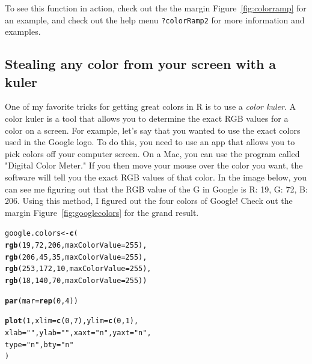 \documentclass{tufte-book}\usepackage[]{graphicx}\usepackage[]{color}
\makeatletter
\newcommand{\hlnum}[1]{\textcolor[rgb]{0.686,0.059,0.569}{#1}}%
\newcommand{\hlstr}[1]{\textcolor[rgb]{0.192,0.494,0.8}{#1}}%
\newcommand{\hlstd}[1]{\textcolor[rgb]{0.345,0.345,0.345}{#1}}%
\newcommand{\hlkwb}[1]{\textcolor[rgb]{0.69,0.353,0.396}{#1}}%
\newcommand{\hlkwc}[1]{\textcolor[rgb]{0.333,0.667,0.333}{#1}}%
\newcommand{\hlkwd}[1]{\textcolor[rgb]{0.737,0.353,0.396}{\textbf{#1}}}%
\newenvironment{kframe}{%
 \def\at@end@of@kframe{}%
 \ifinner\ifhmode%
  \def\at@end@of@kframe{\end{minipage}}%
  \begin{minipage}{\columnwidth}%
 \fi\fi%
 \def\FrameCommand##1{\hskip\@totalleftmargin \hskip-\fboxsep
 \colorbox{shadecolor}{##1}\hskip-\fboxsep
     \hskip-\linewidth \hskip-\@totalleftmargin \hskip\columnwidth}%
 \MakeFramed {\advance\hsize-\width
   \@totalleftmargin\z@ \linewidth\hsize
   \@setminipage}}%
 {\par\unskip\endMakeFramed%
 \at@end@of@kframe}
\newenvironment{knitrout}{}{} %
\makeatother
\begin{document}
\begin{footnotesize}
To see this function in action, check out the the margin Figure~\ref{fig:colorramp} for an example, and check out the help menu \texttt{?colorRamp2} for more information and examples.

\subsection{Stealing any color from your screen with a kuler}

One of my favorite tricks for getting great colors in R is to use a \textit{color kuler}. A color kuler is a tool that allows you to determine the exact RGB values for a color on a screen. For example, let's say that you wanted to use the exact colors used in the Google logo. To do this, you need to use an app that allows you to pick colors off your computer screen. On a Mac, you can use the program called "Digital Color Meter." If you then move your mouse over the color you want, the software will tell you the exact RGB values of that color. In the image below, you can see me figuring out that the RGB value of the G in Google is R: 19, G: 72, B: 206. Using this method, I figured out the four colors of Google! Check out the margin Figure~\ref{fig:googlecolors} for the grand result.

\begin{marginfigure}
\begin{tiny}
\begin{knitrout}
\color{fgcolor}\begin{kframe}
\begin{alltt}
\hlstd{google.colors} \hlkwb{<-} \hlkwd{c}\hlstd{(}
  \hlkwd{rgb}\hlstd{(}\hlnum{19}\hlstd{,} \hlnum{72}\hlstd{,} \hlnum{206}\hlstd{,} \hlkwc{maxColorValue} \hlstd{=} \hlnum{255}\hlstd{),}
  \hlkwd{rgb}\hlstd{(}\hlnum{206}\hlstd{,} \hlnum{45}\hlstd{,} \hlnum{35}\hlstd{,} \hlkwc{maxColorValue} \hlstd{=} \hlnum{255}\hlstd{),}
  \hlkwd{rgb}\hlstd{(}\hlnum{253}\hlstd{,} \hlnum{172}\hlstd{,} \hlnum{10}\hlstd{,} \hlkwc{maxColorValue} \hlstd{=} \hlnum{255}\hlstd{),}
  \hlkwd{rgb}\hlstd{(}\hlnum{18}\hlstd{,} \hlnum{140}\hlstd{,} \hlnum{70}\hlstd{,} \hlkwc{maxColorValue} \hlstd{=} \hlnum{255}\hlstd{))}

\hlkwd{par}\hlstd{(}\hlkwc{mar} \hlstd{=} \hlkwd{rep}\hlstd{(}\hlnum{0}\hlstd{,} \hlnum{4}\hlstd{))}

\hlkwd{plot}\hlstd{(}\hlnum{1}\hlstd{,} \hlkwc{xlim} \hlstd{=} \hlkwd{c}\hlstd{(}\hlnum{0}\hlstd{,} \hlnum{7}\hlstd{),} \hlkwc{ylim} \hlstd{=} \hlkwd{c}\hlstd{(}\hlnum{0}\hlstd{,} \hlnum{1}\hlstd{),}
     \hlkwc{xlab} \hlstd{=} \hlstr{""}\hlstd{,} \hlkwc{ylab} \hlstd{=} \hlstr{""}\hlstd{,} \hlkwc{xaxt} \hlstd{=} \hlstr{"n"}\hlstd{,} \hlkwc{yaxt} \hlstd{=} \hlstr{"n"}\hlstd{,}
     \hlkwc{type} \hlstd{=} \hlstr{"n"}\hlstd{,} \hlkwc{bty} \hlstd{=} \hlstr{"n"}
     \hlstd{)}


\end{alltt}
\end{kframe}
\end{knitrout}
\end{tiny}
\end{marginfigure}
\end{footnotesize}
\end{document}
